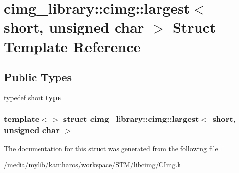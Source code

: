 \hypertarget{structcimg__library_1_1cimg_1_1largest_3_01short_00_01unsigned_01char_01_4}{
\section{cimg\_\-library::cimg::largest$<$ short, unsigned char $>$ Struct Template Reference}
\label{structcimg__library_1_1cimg_1_1largest_3_01short_00_01unsigned_01char_01_4}
}
\subsection*{Public Types}
\begin{DoxyCompactItemize}
\item 
\hypertarget{structcimg__library_1_1cimg_1_1largest_3_01short_00_01unsigned_01char_01_4_a0cc15eadf1d5d93aaa55f66a7970ef43}{
typedef short {\bfseries type}}
\label{structcimg__library_1_1cimg_1_1largest_3_01short_00_01unsigned_01char_01_4_a0cc15eadf1d5d93aaa55f66a7970ef43}

\end{DoxyCompactItemize}
\subsubsection*{template$<$$>$ struct cimg\_\-library::cimg::largest$<$ short, unsigned char $>$}



The documentation for this struct was generated from the following file:\begin{DoxyCompactItemize}
\item 
/media/mylib/kantharos/workspace/STM/libcimg/CImg.h\end{DoxyCompactItemize}
